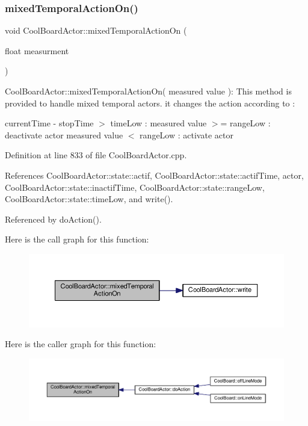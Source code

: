 \subsubsection{\texorpdfstring{mixed\+Temporal\+Action\+On()}{mixedTemporalActionOn()}}
{\footnotesize\ttfamily void Cool\+Board\+Actor\+::mixed\+Temporal\+Action\+On (\begin{DoxyParamCaption}\item[{float}]{measurment }\end{DoxyParamCaption})}

Cool\+Board\+Actor\+::mixed\+Temporal\+Action\+On( measured value )\+: This method is provided to handle mixed temporal actors. it changes the action according to \+:

current\+Time -\/ stop\+Time $>$ time\+Low \+: measured value $>$= range\+Low \+: deactivate actor measured value $<$ range\+Low \+: activate actor 

Definition at line 833 of file Cool\+Board\+Actor.\+cpp.



References Cool\+Board\+Actor\+::state\+::actif, Cool\+Board\+Actor\+::state\+::actif\+Time, actor, Cool\+Board\+Actor\+::state\+::inactif\+Time, Cool\+Board\+Actor\+::state\+::range\+Low, Cool\+Board\+Actor\+::state\+::time\+Low, and write().



Referenced by do\+Action().

Here is the call graph for this function\+:
\nopagebreak
\begin{figure}[H]
\begin{center}
\leavevmode
\includegraphics[width=350pt]{dc/d69/class_cool_board_actor_a216aa7a0cfd1f31d0025cc91c2ecd5dd_cgraph}
\end{center}
\end{figure}
Here is the caller graph for this function\+:
\nopagebreak
\begin{figure}[H]
\begin{center}
\leavevmode
\includegraphics[width=350pt]{dc/d69/class_cool_board_actor_a216aa7a0cfd1f31d0025cc91c2ecd5dd_icgraph}
\end{center}
\end{figure}
\mbox{\label{class_cool_board_actor_adf3b4e15b9d73681082112adf8ef95cb}} 
